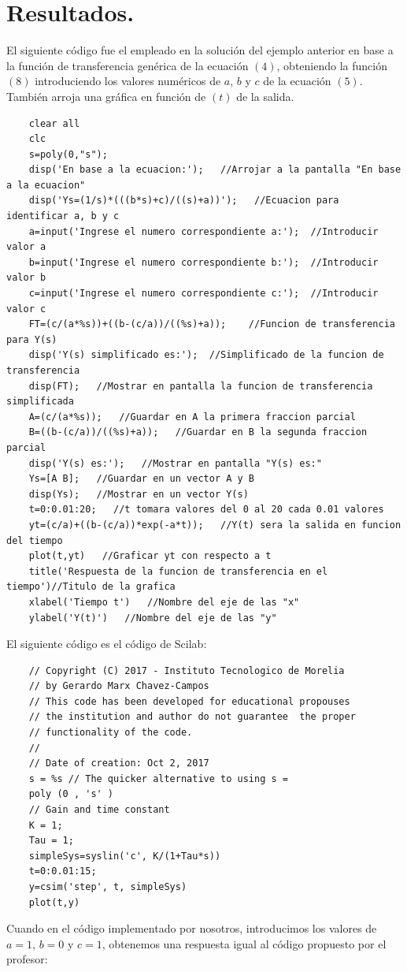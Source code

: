 \documentclass[letterpaper]{article}
\begin{document}
 	\section{Resultados.}
 	El siguiente código fue el empleado en la solución del ejemplo anterior en base a la función de transferencia genérica de la ecuación $ (4) $, obteniendo la función $ (8) $ introduciendo los valores numéricos de $ a $, $ b $ y $ c $ de la ecuación $ (5) $.
 	También arroja una gráfica en función de $ (t) $ de la salida.
	\begin{lstlisting}
	clear all
	clc
	s=poly(0,"s");
	disp('En base a la ecuacion:');   //Arrojar a la pantalla "En base a la ecuacion"
	disp('Ys=(1/s)*(((b*s)+c)/((s)+a))');   //Ecuacion para identificar a, b y c
	a=input('Ingrese el numero correspondiente a:');  //Introducir valor a
	b=input('Ingrese el numero correspondiente b:');  //Introducir valor b
	c=input('Ingrese el numero correspondiente c:');  //Introducir valor c
	FT=(c/(a*%s))+((b-(c/a))/((%s)+a));    //Funcion de transferencia para Y(s)
	disp('Y(s) simplificado es:');  //Simplificado de la funcion de transferencia
	disp(FT);   //Mostrar en pantalla la funcion de transferencia simplificada
	A=(c/(a*%s));   //Guardar en A la primera fraccion parcial
	B=((b-(c/a))/((%s)+a));   //Guardar en B la segunda fraccion parcial
	disp('Y(s) es:');   //Mostrar en pantalla "Y(s) es:"
	Ys=[A B];   //Guardar en un vector A y B
	disp(Ys);   //Mostrar en un vector Y(s)
	t=0:0.01:20;   //t tomara valores del 0 al 20 cada 0.01 valores
	yt=(c/a)+((b-(c/a))*exp(-a*t));   //Y(t) sera la salida en funcion del tiempo
	plot(t,yt)   //Graficar yt con respecto a t
	title('Respuesta de la funcion de transferencia en el tiempo')//Titulo de la grafica
	xlabel('Tiempo t')   //Nombre del eje de las "x"
	ylabel('Y(t)')   //Nombre del eje de las "y"
	\end{lstlisting}
	El siguiente código es el código de Scilab:
	\begin{lstlisting}
	// Copyright (C) 2017 - Instituto Tecnologico de Morelia 
	// by Gerardo Marx Chavez-Campos
	// This code has been developed for educational propouses
	// the institution and author do not guarantee  the proper
	// functionality of the code.
	//
	// Date of creation: Oct 2, 2017
	s = %s // The quicker alternative to using s =
	poly (0 , 's' ) 
	// Gain and time constant
	K = 1;  
	Tau = 1; 
	simpleSys=syslin('c', K/(1+Tau*s))
	t=0:0.01:15;
	y=csim('step', t, simpleSys)
	plot(t,y)	
	\end{lstlisting}
	Cuando en el código implementado por nosotros, introducimos los valores de $ a=1 $, $ b=0 $ y $ c=1 $, obtenemos una respuesta igual al código propuesto por el profesor:
\end{document}

